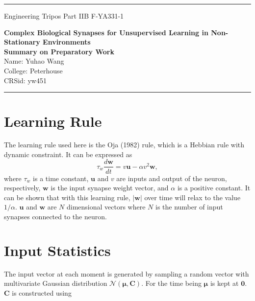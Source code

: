 \documentclass[12pt]{article}
\begin{document}
\noindent
\rule{17.0cm}{0.5mm}
\vspace{0.7cm}


Engineering Tripos Part IIB \hfill F-YA331-1

\begin{center}
{\large{\bf Complex Biological Synapses for Unsupervised Learning in Non-Stationary Environments}}\\
\vspace{1mm}
{\bf Summary on Preparatory Work}\\
\vspace{2mm}
Name: Yuhao Wang\\
College: Peterhouse\\
CRSid: yw451
\end{center}
\rule{17cm}{0.5mm}


\section{Learning Rule}

The learning rule used here is the Oja (1982) rule, which is a Hebbian rule with dynamic constraint. It can be expressed as
\begin{equation}
    \tau_w \dfrac{d\boldsymbol{w}}{dt} = v\boldsymbol{u} - \alpha v^2 \boldsymbol{w},
\end{equation}
where $\tau_w$ is a time constant, $\boldsymbol{u}$ and $v$ are inputs and output of the neuron, respectively, $\boldsymbol{w}$ is the input synapse weight vector, and $\alpha$ is a positive constant. It can be shown that with this learning rule, $|\boldsymbol{w}|$ over time will relax to the value $1/\alpha$. $\boldsymbol{u}$ and $\boldsymbol{w}$ are $N$ dimensional vectors where $N$ is the number of input synapses connected to the neuron.

\section{Input Statistics}
The input vector at each moment is generated by sampling a random vector with multivariate Gaussian distribution $\mathcal{N}(\boldsymbol{\mu}, \boldsymbol{C})$. For the time being $\boldsymbol{\mu}$ is kept at $\boldsymbol{0}$. $\boldsymbol{C}$ is constructed using
\end{document}
